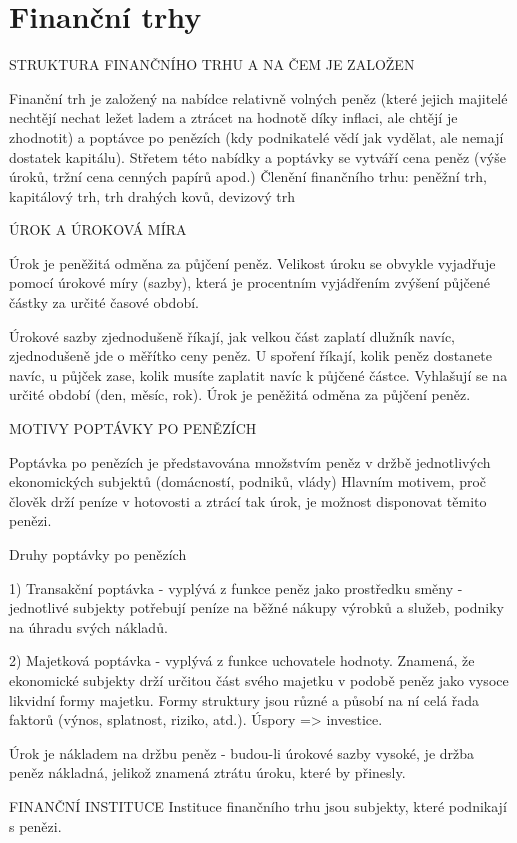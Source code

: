 \chapter{Finanční trhy}

STRUKTURA FINANČNÍHO TRHU A NA ČEM JE ZALOŽEN

Finanční trh je založený na nabídce relativně volných peněz (které jejich majitelé nechtějí nechat ležet ladem a ztrácet
na hodnotě díky inflaci, ale chtějí je zhodnotit) a poptávce po penězích (kdy podnikatelé vědí jak vydělat, ale nemají
dostatek kapitálu). Střetem této nabídky a poptávky se vytváří cena peněz (výše úroků, tržní cena cenných papírů apod.)
Členění finančního trhu: peněžní trh, kapitálový trh, trh drahých kovů, devizový trh

ÚROK A ÚROKOVÁ MÍRA

Úrok je peněžitá odměna za půjčení peněz. Velikost úroku se obvykle vyjadřuje pomocí úrokové míry (sazby), která je
procentním vyjádřením zvýšení půjčené částky za určité časové období.

Úrokové sazby zjednodušeně říkají, jak velkou část zaplatí dlužník navíc, zjednodušeně jde o měřítko ceny peněz. U
spoření říkají, kolik peněz dostanete navíc, u půjček zase, kolik musíte zaplatit navíc k půjčené částce. Vyhlašují se na
určité období (den, měsíc, rok). Úrok je peněžitá odměna za půjčení peněz.

MOTIVY POPTÁVKY PO PENĚZÍCH

Poptávka po penězích je představována množstvím peněz v držbě jednotlivých ekonomických subjektů (domácností,
podniků, vlády) Hlavním motivem, proč člověk drží peníze v hotovosti a ztrácí tak úrok, je možnost disponovat těmito
penězi.

Druhy poptávky po penězích

1) Transakční poptávka - vyplývá z funkce peněz jako prostředku směny - jednotlivé subjekty potřebují peníze na
běžné nákupy výrobků a služeb, podniky na úhradu svých nákladů.

2) Majetková poptávka - vyplývá z funkce uchovatele hodnoty. Znamená, že ekonomické subjekty drží určitou část
svého majetku v podobě peněz jako vysoce likvidní formy majetku. Formy struktury jsou různé a působí na ní celá řada
faktorů (výnos, splatnost, riziko, atd.). Úspory => investice.

Úrok je nákladem na držbu peněz - budou-li úrokové sazby vysoké, je držba peněz nákladná, jelikož znamená ztrátu
úroku, které by přinesly.

FINANČNÍ INSTITUCE
Instituce finančního trhu jsou subjekty, které podnikají s penězi.


